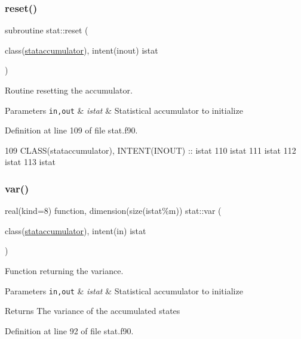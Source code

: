 \subsubsection{\texorpdfstring{reset()}{reset()}}
{\footnotesize\ttfamily subroutine stat\+::reset (\begin{DoxyParamCaption}\item[{class(\hyperlink{structstat_1_1stataccumulator}{stataccumulator}), intent(inout)}]{istat }\end{DoxyParamCaption})\hspace{0.3cm}{\ttfamily [private]}}



Routine resetting the accumulator. 


\begin{DoxyParams}[1]{Parameters}
\mbox{\tt in,out}  & {\em istat} & Statistical accumulator to initialize \\
\hline
\end{DoxyParams}


Definition at line 109 of file stat.\+f90.


\begin{DoxyCode}
109       \textcolor{keywordtype}{CLASS}(stataccumulator), \textcolor{keywordtype}{INTENT(INOUT)} :: istat
110       istat%
111       istat%
112       istat%
113       istat%
\end{DoxyCode}
\mbox{\label{namespacestat_aa03a5f469d96e4b6448153de00af9d08}} 
\subsubsection{\texorpdfstring{var()}{var()}}
{\footnotesize\ttfamily real(kind=8) function, dimension(size(istat\%m)) stat\+::var (\begin{DoxyParamCaption}\item[{class(\hyperlink{structstat_1_1stataccumulator}{stataccumulator}), intent(in)}]{istat }\end{DoxyParamCaption})\hspace{0.3cm}{\ttfamily [private]}}



Function returning the variance. 


\begin{DoxyParams}[1]{Parameters}
\mbox{\tt in,out}  & {\em istat} & Statistical accumulator to initialize \\
\hline
\end{DoxyParams}
\begin{DoxyReturn}{Returns}
The variance of the accumulated states 
\end{DoxyReturn}


Definition at line 92 of file stat.\+f90.


